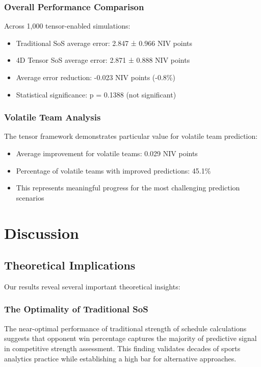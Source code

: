 \documentclass[11pt]{article}
\begin{document}
\subsubsection{Overall Performance Comparison}

Across 1,000 tensor-enabled simulations:
\begin{itemize}
    \item Traditional SoS average error: 2.847 ± 0.966 NIV points
    \item 4D Tensor SoS average error: 2.871 ± 0.888 NIV points
    \item Average error reduction: -0.023 NIV points (-0.8\%)
    \item Statistical significance: p = 0.1388 (not significant)
\end{itemize}

\subsubsection{Volatile Team Analysis}

The tensor framework demonstrates particular value for volatile team prediction:
\begin{itemize}
    \item Average improvement for volatile teams: 0.029 NIV points
    \item Percentage of volatile teams with improved predictions: 45.1\%
    \item This represents meaningful progress for the most challenging prediction scenarios
\end{itemize}

\section{Discussion}

\subsection{Theoretical Implications}

Our results reveal several important theoretical insights:

\subsubsection{The Optimality of Traditional SoS}

The near-optimal performance of traditional strength of schedule calculations suggests that opponent win percentage captures the majority of predictive signal in competitive strength assessment. This finding validates decades of sports analytics practice while establishing a high bar for alternative approaches.
\end{document}
